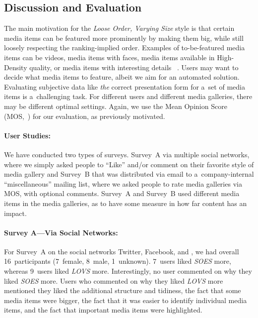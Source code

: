 \subsection{Discussion and Evaluation}
\label{sec:user-studies}

The main motivation for the \emph{Loose Order, Varying Size} style
is that certain media items can be featured more prominently
by making them big, while still loosely respecting the ranking-implied order.
Examples of to-be-featured media items can be videos,
media items with faces, media items available in High-Density quality,
or media items with interesting details~%
\cite{suh2003thumbnail}.
Users may want to decide what media items to feature,
albeit we aim for an automated solution.
Evaluating subjective data like \emph{the} correct presentation form
for a~set of media items is a~challenging task.
For different users and different media galleries,
there may be different optimal settings.
Again, we use the Mean Opinion Score (MOS,~\cite{itu1998mos})
for our evaluation, as previously motivated.

\paragraph{User Studies:}

We have conducted two types of surveys.
Survey~A via multiple social networks, where we simply asked people to ``Like''
and/or comment on their favorite style of media gallery
and Survey~B that was distributed via email to a~company-internal ``miscellaneous'' mailing list,
where we asked people to rate media galleries via MOS, with optional comments.
Survey~A and Survey~B used different media items in the media galleries,
as to have some measure in how far content has an impact.

\paragraph{Survey A---Via Social Networks:}

For Survey~A on the social networks Twitter, Facebook,
and \googleplus, we had overall 16~participants (7~female, 8~male, 1~unknown).
7~users liked \emph{SOES} more,
whereas 9~users liked \emph{LOVS} more.
Interestingly, no user commented on why they liked \emph{SOES} more.
Users who commented on why they liked \emph{LOVS} more mentioned
they liked the additional structure and tidiness,
the fact that some media items were bigger,
the fact that it was easier to identify individual media items,
and the fact that important media items were highlighted.

